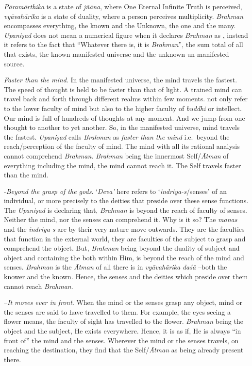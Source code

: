 \emph{Pāramārthika} is a state of \emph{jñāna}, where One Eternal Infinite Truth is perceived, \emph{vyāvahārika} is a state of duality, where a person perceives multiplicity. \emph{Brahman} encompasses everything, the known and the Unknown, the one and the many. \emph{Upaniṣad} does not mean a numerical figure when it declares \emph{Brahman} as , instead it refers to the fact that ``Whatever there is, it is \emph{Brahman}'', the sum total of all that exists, the known manifested universe and the unknown un-manifested source.

 \emph{Faster than the mind}. In the manifested universe, the mind travels the fastest. The speed of thought is held to be faster than that of light. A trained mind can travel back and forth through different realms within few moments.  not only refer to the lower faculty of mind but also to the higher faculty of \emph{buddhi} or intellect. Our mind is full of hundreds of thoughts at any moment. And we jump from one thought to another to yet another. So, in the manifested universe, mind travels the fastest. \emph{Upaniṣad} calls \emph{Brahman} as \emph{faster than the mind} i.e.\ beyond the reach/perception of the faculty of mind. The mind with all its rational analysis cannot comprehend \emph{Brahman}. \emph{Brahman} being the innermost Self/\emph{Ātman} of everything including the mind, the mind cannot reach it. The Self travels faster than the mind.

 -\emph{Beyond the grasp of the gods}. `\emph{Deva'} here refers to `\emph{indriya-s}/senses' of an individual, or more precisely to the deities that preside over these sense functions. The \emph{Upaniṣad} is declaring that, \emph{Brahman} is beyond the reach of faculty of senses. Neither the mind, nor the senses can comprehend it. Why is it so? The \emph{manas} and the \emph{indriya-s} are by their very nature move outwards. They are the faculties that function in the external world, they are faculties of the subject to grasp and comprehend the object. But, \emph{Brahman} being beyond the duality of subject and object and containing the both within Him, is beyond the reach of the mind and senses. \emph{Brahman} is the \emph{Ātman} of all there is in \emph{vyāvahārika} \emph{daśā} --both the knower and the known. Hence, the senses and the deities which preside over them cannot reach \emph{Brahman}.

 --\emph{It moves ever in front}. When the mind or the senses grasp any object, mind or the senses are said to have travelled to them. For example, the eyes seeing a flower means, the faculty of sight has travelled to the flower. \emph{Brahman} being the object and the subject, He exists everywhere. Hence, it is as if, He is always ``in front of'' the mind and the senses. Wherever the mind or the senses travels, on reaching the destination, they find that the Self/\emph{Ātman} as being already present there.

